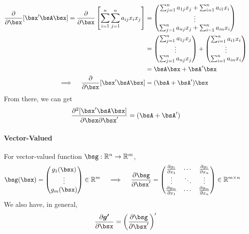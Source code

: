 \documentclass[12pt]{article}
\theoremstyle{plain}
\theoremstyle{definition}
\theoremstyle{remark}
\newcommand{\sumin}{\sum^n_{i=1}}
\newcommand{\sumjn}{\sum^n_{j=1}}
\begin{document}
\begin{align*}
  \frac{\partial}{\partial \bsx}
  [\bsx'\bsA\bsx]
  =
  \frac{\partial}{\partial \bsx}
  \left[
    \sumin
    \sumjn
    a_{ij} x_i x_j
  \right]
  &=
  \begin{pmatrix}
    \sumjn a_{1j} x_j
    + \sumin a_{i1} x_i \\
    \vdots \\
    \sumjn a_{nj} x_j
    + \sumin a_{in} x_i \\
  \end{pmatrix}\\
  &=
  \begin{pmatrix}
    \sumjn a_{1j} x_j \\
    \vdots \\
    \sumjn a_{nj} x_j
  \end{pmatrix}
  +
  \begin{pmatrix}
    \sumin a_{i1} x_i \\
    \vdots \\
    \sumin a_{in} x_i \\
  \end{pmatrix}\\
  &= \bsA\bsx + \bsA'\bsx\\
  \implies\quad
  \frac{\partial}{\partial \bsx}
  [\bsx'\bsA\bsx]
  &= (\bsA+\bsA')\bsx
\end{align*}
From there, we can get
\begin{align*}
  \frac{\partial^2[\bsx'\bsA\bsx]}{\partial \bsx \partial \bsx'}
  =
  (\bsA + \bsA')
\end{align*}


\paragraph{Vector-Valued}

For vector-valued function $\bsg:
\mathbb{R}^n\rightarrow\mathbb{R}^m$,
\begin{align*}
  \bsg(\bsx)
  &=
  \begin{pmatrix}
    g_1(\bsx) \\
    \vdots \\
    g_m(\bsx) \\
  \end{pmatrix}\in \mathbb{R}^m
  \quad\implies\quad
  \frac{\partial \bsg}{\partial \bsx'}
  =
  \begin{pmatrix}
    \frac{\partial g_1}{\partial x_1}
      & \cdots & \frac{\partial g_1}{\partial x_n}\\
    \vdots & \ddots & \vdots\\
    \frac{\partial g_m}{\partial x_1}
      & \cdots & \frac{\partial g_m}{\partial x_n}\\
  \end{pmatrix}
  \in \mathbb{R}^{m\times n}
\end{align*}
We also have, in general,
\begin{align*}
  \frac{\partial\boldsymbol{g'}}{\partial \bsx}
  =
  \left(
  \frac{\partial\bsg}{\partial \bsx'}
  \right)'
\end{align*}
\end{document}
